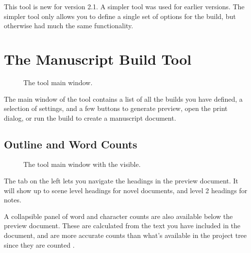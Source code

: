 \documentclass[a4paper,11pt,english]{sphinxmanual}
\begin{document}
\sphinxAtStartPar
{}This tool is new for version 2.1. A simpler tool was used for earlier versions. The simpler tool
only allows you to define a single set of options for the build, but otherwise had much the same
functionality.


\section{The Manuscript Build Tool}
\label{\detokenize{project_manuscript:the-manuscript-build-tool}}\label{\detokenize{project_manuscript:a-manuscript-main}}
\begin{figure}[htbp]
\centering
\capstart

\noindent{}
\caption{The  tool main window.}\label{\detokenize{project_manuscript:id1}}\end{figure}

\sphinxAtStartPar
The main window of the  tool contains a list of all the builds you have
defined, a selection of settings, and a few buttons to generate preview, open the print dialog, or
run the build to create a manuscript document.


\subsection{Outline and Word Counts}
\label{\detokenize{project_manuscript:outline-and-word-counts}}
\begin{figure}[htbp]
\centering
\capstart

\noindent{}
\caption{The  tool main window with the  visible.}\label{\detokenize{project_manuscript:id2}}\end{figure}

\sphinxAtStartPar
The  tab on the left lets you navigate the headings in the preview document. It will
show up to scene level headings for novel documents, and level 2 headings for notes.

\sphinxAtStartPar
A collapsible panel of word and character counts are also available below the preview document.
These are calculated from the text you have included in the document, and are more accurate counts
than what’s available in the project tree since they are counted .
\end{document}
